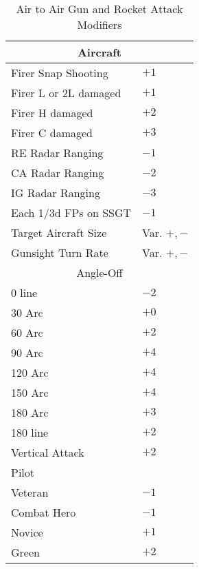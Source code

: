 \begin{table}
\centering
\caption{Air to Air Gun and Rocket Attack Modifiers}
\medskip
\begin{tabular}{ll}
\hline
\multicolumn{2}{c}{Aircraft}\\
\hline
Firer Snap Shooting&$+1$\\
Firer L or 2L damaged&$+1$\\
Firer H damaged&$+2$\\
Firer C damaged&$+3$\\
RE Radar Ranging&$-1$\\
CA Radar Ranging&$-2$\\
IG Radar Ranging&$-3$\\
Each 1/3d FPs on SSGT&$-1$\\
Target Aircraft Size&Var. $+,-$\\
Gunsight Turn Rate&Var. $+,-$\\
\hline
\multicolumn{2}{c}{Angle-Off}\\
\hline
0 line&$-2$\\
30 Arc&$+0$\\
60 Arc&$+2$\\
90 Arc&$+4$\\
120 Arc&$+4$\\
150 Arc&$+4$\\
180 Arc&$+3$\\
180 line&$+2$\\
Vertical Attack&$+2$\\
\hline
Pilot\\
\hline
Veteran&$-1$\\
Combat Hero&$-1$\\
Novice&$+1$\\
Green&$+2$\\
\hline
\end{tabular}
\end{table}